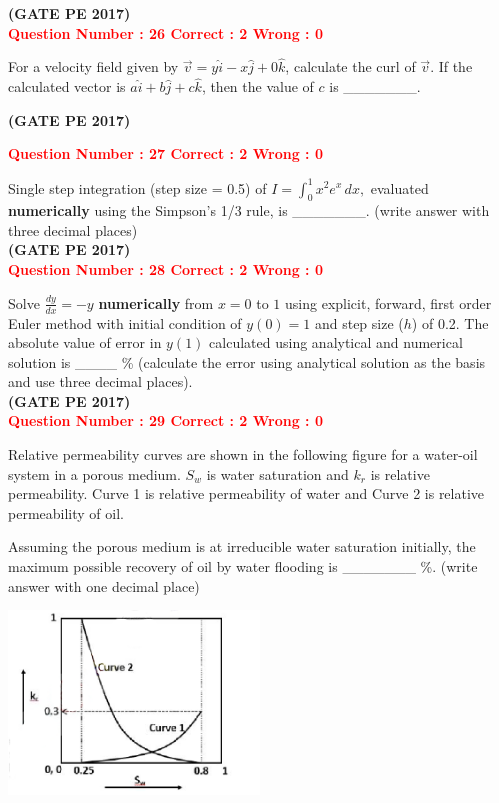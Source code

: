 \documentclass[journal,12pt,onecolumn]{article}
\begin{document}
{\hfill\textbf{(GATE PE 2017)}\\[0.6cm]

\textcolor{red}{\textbf{Question Number : 26 \hfill Correct : 2  Wrong : 0}}

For a velocity field given by $\vec{v} = y \hat{i} - x \hat{j} + 0 \hat{k}$, calculate the curl of $\vec{v}$. If the calculated vector is $a \hat{i} + b \hat{j} + c \hat{k}$, then the value of $c$ is \_\_\_\_\_\_\_.

\hfill\textbf{(GATE PE 2017)}\\[0.6cm]

\newpage


\textcolor{red}{\textbf{Question Number : 27 \hfill Correct : 2  Wrong : 0}}

Single step integration (step size = 0.5) of 
$ 
I = \int_0^1 x^2 e^x \, dx,
$
evaluated \textbf{numerically} using the Simpson’s 1/3 rule, is \_\_\_\_\_\_\_. (write answer with three decimal places)\\

\hfill\textbf{(GATE PE 2017)}\\[0.6cm]


\textcolor{red}{\textbf{Question Number : 28 \hfill Correct : 2  Wrong : 0}}

Solve 
{\LARGE$ 
\frac{dy}{dx} = -y
$ }
\textbf{numerically} from $x = 0$ to $1$ using explicit, forward, first order Euler method with initial condition of $y(0) = 1$ and step size ($h$) of 0.2. The absolute value of error in $y(1)$ calculated using analytical and numerical solution is \_\_\_\_ \% (calculate the error using analytical solution as the basis and use three decimal places).\\

\hfill\textbf{(GATE PE 2017)}\\[0.6cm]


\textcolor{red}{\textbf{Question Number : 29 \hfill Correct : 2  Wrong : 0}}

Relative permeability curves are shown in the following figure for a water-oil system in a porous medium. $S_w$ is water saturation and $k_r$ is relative permeability. Curve 1 is relative permeability of water and Curve 2 is relative permeability of oil.

Assuming the porous medium is at irreducible water saturation initially, the maximum possible recovery of oil by water flooding is \_\_\_\_\_\_\_ \%. (write answer with one decimal place)\\

\begin{center}
    \includegraphics[width=0.5\textwidth]{Figs/GraphQ_29.png} 
\end{center}

}
\end{document}

